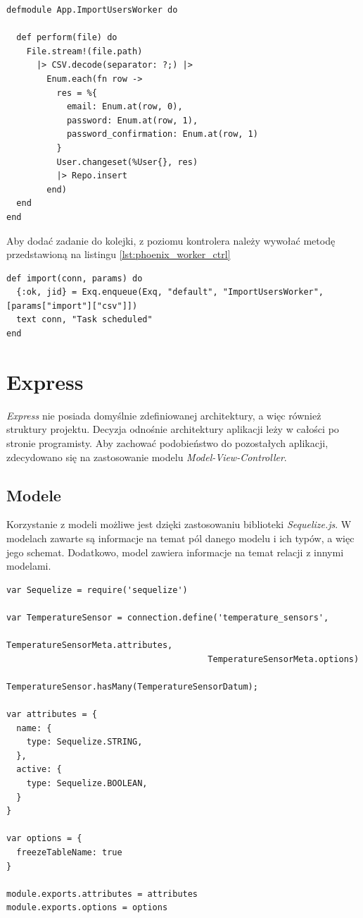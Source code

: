 \begin{lstlisting}[caption={Worker umożliwiający import użytkowników z pliku csv we frameworku Phoenix.},label={lst:phoenix_worker}]
defmodule App.ImportUsersWorker do

  def perform(file) do
    File.stream!(file.path)
      |> CSV.decode(separator: ?;) |>
        Enum.each(fn row ->
          res = %{
            email: Enum.at(row, 0),
            password: Enum.at(row, 1),
            password_confirmation: Enum.at(row, 1)
          }
          User.changeset(%User{}, res)
          |> Repo.insert
        end)
  end
end
\end{lstlisting}

Aby dodać zadanie do kolejki, z poziomu kontrolera należy wywołać metodę przedstawioną na listingu \ref{lst:phoenix_worker_ctrl}

\begin{lstlisting}[caption={Dodanie zadania do kolejki przetwarzania w tle we frameworku Phoenix.},label={lst:phoenix_worker_ctrl}]
def import(conn, params) do
  {:ok, jid} = Exq.enqueue(Exq, "default", "ImportUsersWorker", [params["import"]["csv"]])
  text conn, "Task scheduled"
end
\end{lstlisting}

\section{Express}
\emph{Express} nie posiada domyślnie zdefiniowanej architektury, a więc również struktury projektu. Decyzja odnośnie architektury aplikacji leży w całości po stronie programisty. Aby zachować podobieństwo do pozostałych aplikacji, zdecydowano się na zastosowanie modelu \emph{Model-View-Controller}.

\subsection{Modele}
Korzystanie z modeli możliwe jest dzięki zastosowaniu biblioteki \emph{Sequelize.js}. W modelach zawarte są informacje na temat pól danego modelu i ich typów, a więc jego schemat. Dodatkowo, model zawiera informacje na temat relacji z innymi modelami.

\begin{lstlisting}[caption={Model sensora temperatury w Express'ie.},label={lst:express_temp_sensor_model}]
var Sequelize = require('sequelize')

var TemperatureSensor = connection.define('temperature_sensors',
                                        TemperatureSensorMeta.attributes,
                                        TemperatureSensorMeta.options)

TemperatureSensor.hasMany(TemperatureSensorDatum);

var attributes = {
  name: {
    type: Sequelize.STRING,
  },
  active: {
    type: Sequelize.BOOLEAN,
  }
}

var options = {
  freezeTableName: true
}

module.exports.attributes = attributes
module.exports.options = options
\end{lstlisting}

